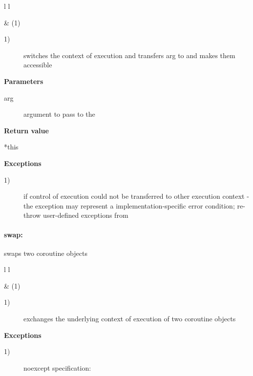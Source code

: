 \begin{tabular}{ l l }
    \midrule

     & (1)\\

    \midrule
\end{tabular}

\begin{description}
    \item[1)] switches the context of execution and transfers arg to
              \corofunction and makes them accessible
\end{description}

{\bf Parameters}
\begin{description}
    \item[arg] argument to pass to the \corofunction
\end{description}

{\bf Return value}
\begin{description}
    \item[*this]
\end{description}

{\bf Exceptions}
\begin{description}
    \item[1)]  if control of execution could not be
              transferred to other execution context - the exception may
              represent a implementation-specific error condition; re-throw
              user-defined exceptions from \corofunction
\end{description}

\paragraph*{swap:}
swaps two coroutine objects\\

\begin{tabular}{ l l }
    \midrule

     & (1)\\

    \midrule
\end{tabular}

\begin{description}
    \item[1)] exchanges the underlying context of execution of two coroutine objects
\end{description}

{\bf Exceptions}
\begin{description}
    \item[1)] noexcept specification: 
\end{description}

